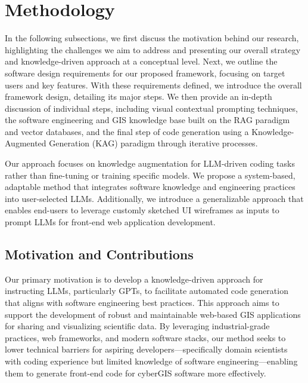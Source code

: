 \section{Methodology}
\label{Methdology}
In the following subsections, we first discuss the motivation behind our research, highlighting the challenges we aim to address and presenting our overall strategy and knowledge-driven approach at a conceptual level. Next, we outline the software design requirements for our proposed framework, focusing on target users and key features. With these requirements defined, we introduce the overall framework design, detailing its major steps. We then provide an in-depth discussion of individual steps, including visual contextual prompting techniques, the software engineering and GIS knowledge base built on the RAG paradigm and vector databases, and the final step of code generation using a Knowledge-Augmented Generation (KAG) paradigm through iterative processes. 

Our approach focuses on knowledge augmentation for LLM-driven coding tasks rather than fine-tuning or training specific models. We propose a system-based, adaptable method that integrates software knowledge and engineering practices into user-selected LLMs. Additionally, we introduce a generalizable approach that enables end-users to leverage customly sketched UI wireframes as inputs to prompt LLMs for front-end web application development.

\subsection{Motivation and Contributions}
Our primary motivation is to develop a knowledge-driven approach for instructing LLMs, particularly GPTs, to facilitate automated code generation that aligns with software engineering best practices. This approach aims to support the development of robust and maintainable web-based GIS applications for sharing and visualizing scientific data. By leveraging industrial-grade practices, web frameworks, and modern software stacks, our method seeks to lower technical barriers for aspiring developers—specifically domain scientists with coding experience but limited knowledge of software engineering—enabling them to generate front-end code for cyberGIS software more effectively.

